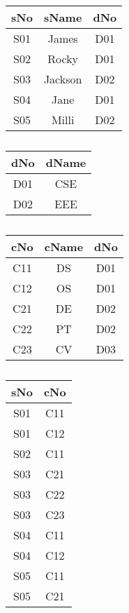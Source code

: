 \begin{table}[h!]
\centering
\begin{tabular}{|c|c|c|}
\hline
sNo & sName & dNo \\
\hline
S01 & James   & D01 \\
S02 & Rocky   & D01 \\
S03 & Jackson & D02 \\
S04 & Jane    & D01 \\
S05 & Milli   & D02 \\
\hline
\end{tabular}
\quad
\begin{tabular}{|c|c|}
\hline
dNo & dName \\
\hline
D01 & CSE \\
D02 & EEE \\
\hline
\end{tabular}
\quad
\begin{tabular}{|c|c|c|}
\hline
cNo & cName & dNo \\
\hline
C11 & DS & D01 \\
C12 & OS & D01 \\
C21 & DE & D02 \\
C22 & PT & D02 \\
C23 & CV & D03 \\
\hline
\end{tabular}
\quad
\begin{tabular}{|c|c|}
\hline
sNo & cNo \\
\hline
S01 & C11 \\
S01 & C12 \\
S02 & C11 \\
S03 & C21 \\
S03 & C22 \\
S03 & C23 \\
S04 & C11 \\
S04 & C12 \\
S05 & C11 \\
S05 & C21 \\
\hline
\end{tabular}
\caption*{}
\label{tab:q56}
\end{table}